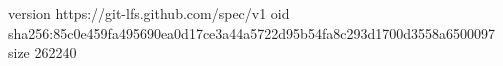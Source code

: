version https://git-lfs.github.com/spec/v1
oid sha256:85c0e459fa495690ea0d17ce3a44a5722d95b54fa8c293d1700d3558a6500097
size 262240
